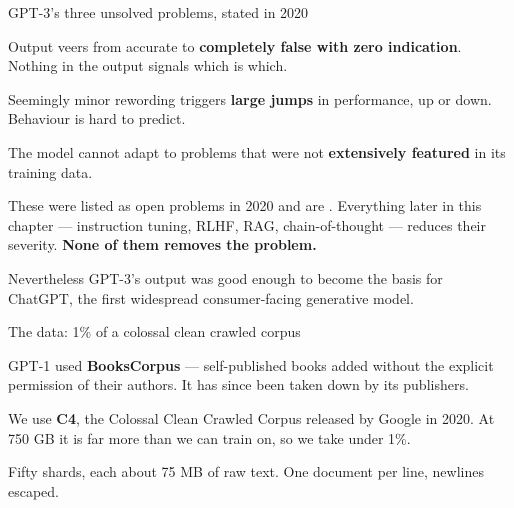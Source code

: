 \documentclass[aspectratio=169,11pt,t]{beamer}
\begin{document}
\begin{frame}[shrink=25]{GPT-3's three unsolved problems, stated in 2020}
\begin{minipage}[t]{0.3253\textwidth}
\begin{icardbad}
Output veers from accurate to \textbf{completely false with zero indication}. Nothing in the output signals which is which.
\end{icardbad}
\end{minipage}%
\hfill
\begin{minipage}[t]{0.3253\textwidth}
\begin{icardbad}
Seemingly minor rewording triggers \textbf{large jumps} in performance, up or down. Behaviour is hard to predict.
\end{icardbad}
\end{minipage}%
\hfill
\begin{minipage}[t]{0.3253\textwidth}
\begin{icardbad}
The model cannot adapt to problems that were not \textbf{extensively featured} in its training data.
\end{icardbad}
\end{minipage}%
\begin{iband}[rose]
These were listed as open problems in 2020 and are . Everything later in this chapter --- instruction tuning, RLHF, RAG, chain-of-thought --- reduces their severity. \textbf{None of them removes the problem.}
\end{iband}
{\fontsize{9.4}{12.6}\selectfont\color{fg2}Nevertheless GPT-3's output was good enough to become the basis for ChatGPT, the first widespread consumer-facing generative model.\par}\vskip 4pt
\end{frame}


\begin{frame}[shrink=25]{The data: 1\% of a colossal clean crawled corpus}
{\fontsize{9.4}{12.6}\selectfont\color{fg2}GPT-1 used \textbf{BooksCorpus} --- self-published books added without the explicit permission of their authors. It has since been taken down by its publishers.\par}\vskip 4pt
{\fontsize{9.4}{12.6}\selectfont\color{fg2}We use \textbf{C4}, the Colossal Clean Crawled Corpus released by Google in 2020. At 750 GB it is far more than we can train on, so we take under 1\%.\par}\vskip 4pt
{\fontsize{9.4}{12.6}\selectfont\color{fg2}Fifty shards, each about 75 MB of raw text. One document per line, newlines escaped.\par}\vskip 4pt
\end{frame}
\end{document}
